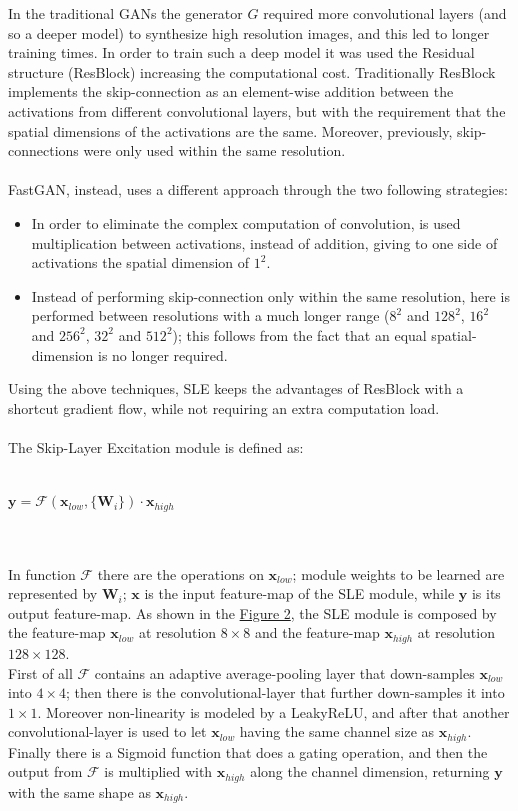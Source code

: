 \documentclass[12pt]{article}
\begin{document}
In the traditional GANs the generator $G$ required more convolutional layers (and so a deeper model) to synthesize 
high resolution images, and this led to longer training times. 
In order to train such a deep model it was used the Residual structure (ResBlock) increasing the computational cost.
Traditionally ResBlock implements the skip-connection as an element-wise addition between the activations from different
convolutional layers, but with the requirement that the spatial dimensions of the activations are the same.
Moreover, previously, skip-connections were only used within the same resolution.\\\\
FastGAN, instead, uses a different approach through the two following strategies:
\begin{itemize}
	\setlength\itemsep{0.01em}
	\item {	
	In order to eliminate the complex computation of convolution, is used multiplication between activations, instead of 
	addition, giving to one side of activations the spatial dimension of $1^2$.
	}
	\item {
	Instead of performing skip-connection only within the same resolution, here is performed between resolutions with a much
	longer range ($8^2$ and $128^2$, $16^2$ and $256^2$, $32^2$ and $512^2$); this follows from the fact that an equal spatial-dimension
	is no longer required.
	}
\end{itemize} 
Using the above techniques, SLE keeps the advantages of ResBlock with a shortcut gradient flow, while not requiring an extra computation
load.\\\\
The Skip-Layer Excitation module is defined as:\\\\
\centerline{$\mathbf{y} = \mathcal{F}(\mathbf{x}_{low}, \{\mathbf{W}_i\})\cdot \mathbf{x}_{high}$}\\\\
In function $\mathcal{F}$ there are the operations on $\mathbf{x}_{low}$; module weights to be learned are represented by $\mathbf{W}_i$; 
$\mathbf{x}$ is the input feature-map of the SLE module, while $\mathbf{y}$ is its output feature-map.
As shown in the \hyperref[fig:fig2]{Figure 2}, the SLE module is composed by the feature-map $\mathbf{x}_{low}$ at resolution $8 \times 8$ and
the feature-map $\mathbf{x}_{high}$ at resolution $128 \times 128$.\\
First of all $\mathcal{F}$ contains an adaptive average-pooling layer that down-samples $\mathbf{x}_{low}$ into $4 \times 4$; then there is the
convolutional-layer that further down-samples it into $1 \times 1$. Moreover non-linearity is modeled by a LeakyReLU, and after that another 
convolutional-layer is used to let $\mathbf{x}_{low}$ having the same channel size as $\mathbf{x}_{high}$. Finally there is a Sigmoid function that
does a gating operation, and then the output from $\mathcal{F}$ is multiplied with $\mathbf{x}_{high}$ along the channel dimension, returning $\mathbf{y}$
with the same shape as $\mathbf{x}_{high}$.
\end{document}
